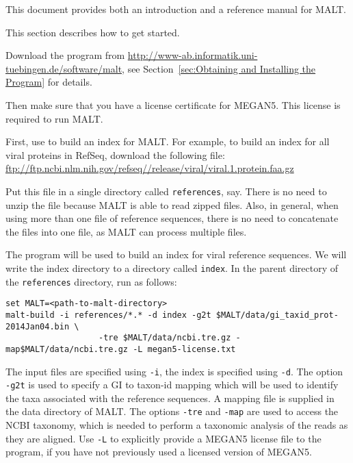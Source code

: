 \documentclass[11pt]{article}
\newcommand\MALT{{\sf MALT}\xspace}
\begin{document}
This document provides both an introduction and a reference manual for \MALT.

\pagebreak

This section describes how to get started.

Download the program from \url{http://www-ab.informatik.uni-tuebingen.de/software/malt}, 
see Section~\ref{sec:Obtaining and Installing the Program}
for details.

Then make sure that you have a license certificate for MEGAN5. This license is required to run \MALT.


First, use  to build an index for \MALT. For example,
to build an index for all viral proteins in RefSeq, download the following file:
\url{ftp://ftp.ncbi.nlm.nih.gov/refseq//release/viral/viral.1.protein.faa.gz}


Put this file in a single directory called {\tt references}, say. There is no need to unzip the file
because \MALT is able to read zipped files. Also, in general, when using more than one file of reference sequences,
there is no need to concatenate the files into one file, as \MALT can process multiple files.

The program  will be used to build an index for viral reference sequences. We will write the index
directory to a directory called {\tt index}.
In the parent directory of the {\tt references} directory, run  as follows:
{\footnotesize
\begin{verbatim}
set MALT=<path-to-malt-directory>
malt-build -i references/*.* -d index -g2t $MALT/data/gi_taxid_prot-2014Jan04.bin \
                   -tre $MALT/data/ncbi.tre.gz -map$MALT/data/ncbi.tre.gz -L megan5-license.txt
\end{verbatim}
}

The input files are specified using {\tt -i}, the index is specified using {\tt -d}. 
The option {\tt -g2t} is used to specify a GI to taxon-id mapping which will be used to identify the taxa associated with
the reference sequences. A mapping file is supplied in the data directory of \MALT.
The options {\tt -tre} and {\tt -map} are used to access the NCBI taxonomy, which is needed to perform a taxonomic analysis of the reads as they are aligned. Use {\tt -L} to explicitly provide a MEGAN5 license file to the program, if you have not previously used a licensed version of MEGAN5.
\end{document}
